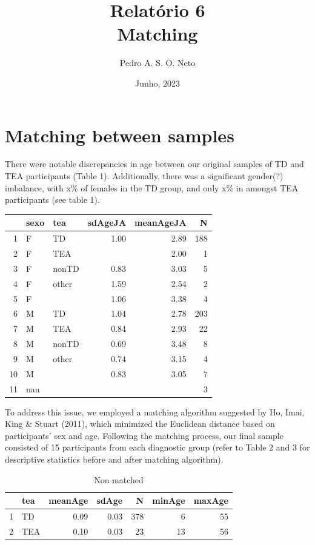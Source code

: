 \documentclass{article}
\title{Relatório 6 \\ Matching}
\author{Pedro A. S. O. Neto}
\date{Junho, 2023}
\begin{document}
\maketitle

\section{Matching between samples}

There were notable discrepancies in age between our original samples of TD and TEA participants (Table 1). Additionally, there was a significant gender(?) imbalance, with x\% of females in the TD group, and only x\% in amongst TEA participants (see table 1).

\begin{table}[ht]
\centering
\begin{tabular}{rllrrr}
  \hline
 & sexo & tea & sdAgeJA & meanAgeJA & N \\ 
  \hline
1 & F & TD & 1.00 & 2.89 & 188 \\ 
  2 & F & TEA &  & 2.00 &   1 \\ 
  3 & F & nonTD & 0.83 & 3.03 &   5 \\ 
  4 & F & other & 1.59 & 2.54 &   2 \\ 
  5 & F &  & 1.06 & 3.38 &   4 \\ 
  6 & M & TD & 1.04 & 2.78 & 203 \\ 
  7 & M & TEA & 0.84 & 2.93 &  22 \\ 
  8 & M & nonTD & 0.69 & 3.48 &   8 \\ 
  9 & M & other & 0.74 & 3.15 &   4 \\ 
  10 & M &  & 0.83 & 3.05 &   7 \\ 
  11 & nan &  &  &  &   3 \\ 
   \hline
\end{tabular}
\end{table}

To address this issue, we employed a matching algorithm suggested by Ho, Imai, King \& Stuart (2011), which minimized the Euclidean distance based on participants' sex and age. Following the matching process, our final sample consisted of 15 participants from each diagnostic group (refer to Table 2 and 3 for descriptive statistics before and after matching algorithm).


\begin{table}[ht]
\caption{Non matched}
\centering
\begin{tabular}{rlrrrrr}
  \hline
 & tea & meanAge & sdAge & N & minAge & maxAge \\ 
  \hline
1 & TD & 0.09 & 0.03 & 378 &   6 &  55 \\ 
  2 & TEA & 0.10 & 0.03 &  23 &  13 &  56 \\ 
   \hline
\end{tabular}
\end{table}
\end{document}
